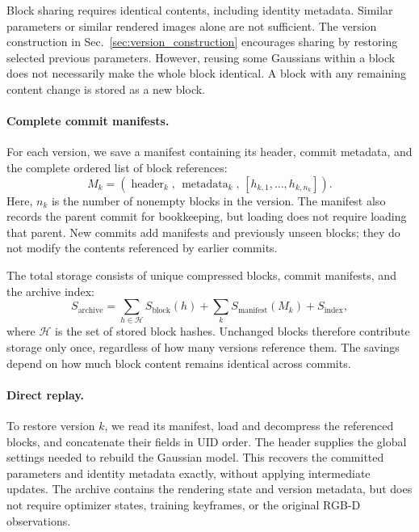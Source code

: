 Block sharing requires identical contents, including identity metadata.
Similar parameters or similar rendered images alone are not sufficient.
The version construction in Sec.~\ref{sec:version_construction}
encourages sharing by restoring selected previous parameters.
However, reusing some Gaussians within a block does not necessarily
make the whole block identical.
A block with any remaining content change is stored as a new block.

\paragraph{Complete commit manifests.}
For each version, we save a manifest containing its header,
commit metadata, and the complete ordered list of block references:
\begin{equation}
    M_k =
    \left(
        \operatorname{header}_k,\,
        \operatorname{metadata}_k,\,
        [h_{k,1},\ldots,h_{k,n_k}]
    \right).
\end{equation}
Here, $n_k$ is the number of nonempty blocks in the version.
The manifest also records the parent commit for bookkeeping,
but loading does not require loading that parent.
New commits add manifests and previously unseen blocks;
they do not modify the contents referenced by earlier commits.

The total storage consists of unique compressed blocks,
commit manifests, and the archive index:
\begin{equation}
    S_{\mathrm{archive}}
    =
    \sum_{h\in\mathcal{H}} S_{\mathrm{block}}(h)
    +
    \sum_k S_{\mathrm{manifest}}(M_k)
    +
    S_{\mathrm{index}},
\end{equation}
where $\mathcal{H}$ is the set of stored block hashes.
Unchanged blocks therefore contribute storage only once,
regardless of how many versions reference them.
The savings depend on how much block content remains identical
across commits.

\paragraph{Direct replay.}
To restore version $k$, we read its manifest, load and decompress
the referenced blocks, and concatenate their fields in UID order.
The header supplies the global settings needed to rebuild
the Gaussian model.
This recovers the committed parameters and identity metadata exactly,
without applying intermediate updates.
The archive contains the rendering state and version metadata,
but does not require optimizer states, training keyframes,
or the original RGB-D observations.

